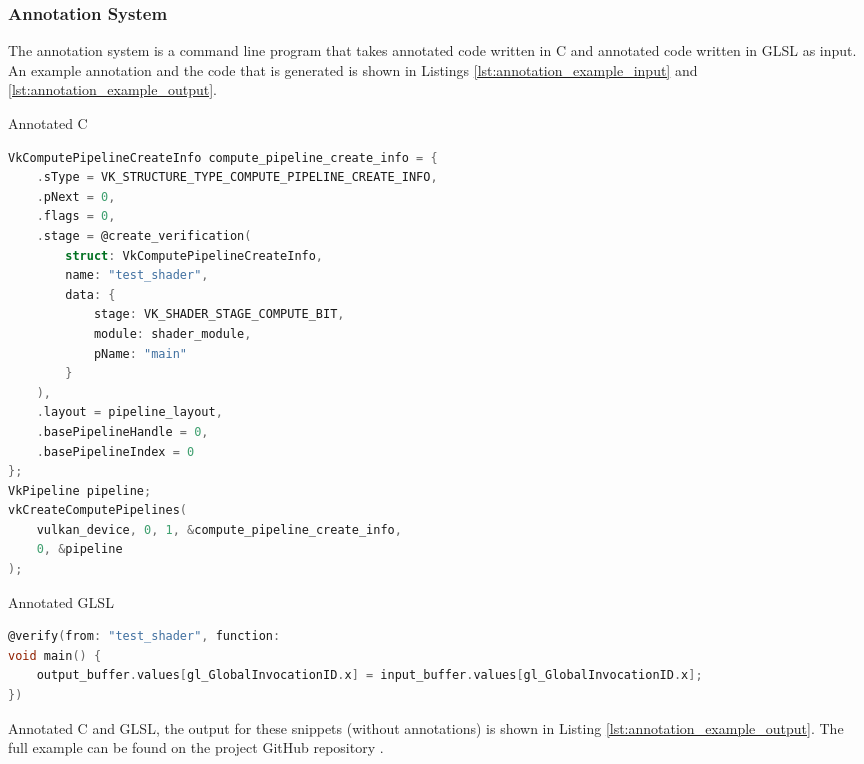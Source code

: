 \documentclass[a4paper,12pt,twoside,openright]{report}
\begin{document}
\subsubsection{Annotation System}

The annotation system is a command line program that takes annotated code
written in C and annotated code written in GLSL as input. An example annotation
and the code that is generated is shown in Listings
\ref{lst:annotation_example_input} and \ref{lst:annotation_example_output}.

\begin{lstfloat}
\begin{center} Annotated C \end{center}
\begin{lstlisting}[language=C]
VkComputePipelineCreateInfo compute_pipeline_create_info = {
    .sType = VK_STRUCTURE_TYPE_COMPUTE_PIPELINE_CREATE_INFO,
    .pNext = 0,
    .flags = 0,
    .stage = @create_verification(
        struct: VkComputePipelineCreateInfo,
        name: "test_shader",
        data: {
            stage: VK_SHADER_STAGE_COMPUTE_BIT,
            module: shader_module,
            pName: "main"
        }
    ),
    .layout = pipeline_layout,
    .basePipelineHandle = 0,
    .basePipelineIndex = 0
};
VkPipeline pipeline;
vkCreateComputePipelines(
    vulkan_device, 0, 1, &compute_pipeline_create_info,
    0, &pipeline
);
\end{lstlisting}
\begin{center} Annotated GLSL \end{center}
\begin{lstlisting}[language=C]
@verify(from: "test_shader", function:
void main() {
    output_buffer.values[gl_GlobalInvocationID.x] = input_buffer.values[gl_GlobalInvocationID.x];
})
\end{lstlisting}
\caption{Annotated C and GLSL, the output for these snippets (without
annotations) is shown in Listing \ref{lst:annotation_example_output}. The full
example can be found on the project GitHub repository \cite{ProjectSource}.}
\label{lst:annotation_example_input}
\end{lstfloat}
\end{document}
